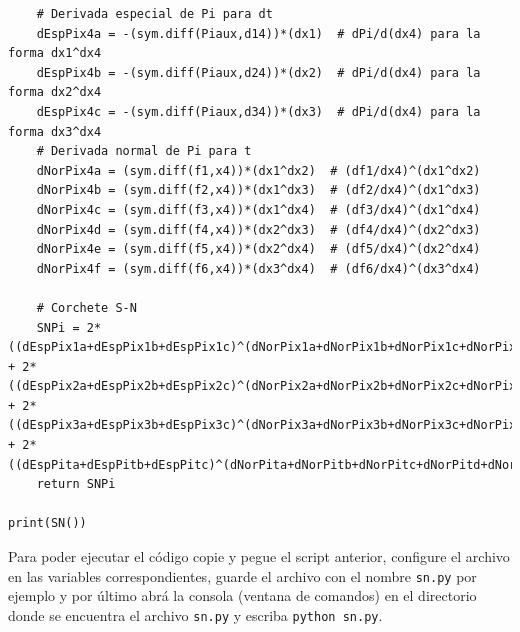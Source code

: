 \documentclass[a4paper,10pt]{book}
\begin{document}
\begin{lstlisting}
    # Derivada especial de Pi para dt 
    dEspPix4a = -(sym.diff(Piaux,d14))*(dx1)  # dPi/d(dx4) para la forma dx1^dx4
    dEspPix4b = -(sym.diff(Piaux,d24))*(dx2)  # dPi/d(dx4) para la forma dx2^dx4
    dEspPix4c = -(sym.diff(Piaux,d34))*(dx3)  # dPi/d(dx4) para la forma dx3^dx4
    # Derivada normal de Pi para t 
    dNorPix4a = (sym.diff(f1,x4))*(dx1^dx2)  # (df1/dx4)^(dx1^dx2)
    dNorPix4b = (sym.diff(f2,x4))*(dx1^dx3)  # (df2/dx4)^(dx1^dx3)
    dNorPix4c = (sym.diff(f3,x4))*(dx1^dx4)  # (df3/dx4)^(dx1^dx4)
    dNorPix4d = (sym.diff(f4,x4))*(dx2^dx3)  # (df4/dx4)^(dx2^dx3)
    dNorPix4e = (sym.diff(f5,x4))*(dx2^dx4)  # (df5/dx4)^(dx2^dx4)
    dNorPix4f = (sym.diff(f6,x4))*(dx3^dx4)  # (df6/dx4)^(dx3^dx4)
    
    # Corchete S-N 
    SNPi = 2*((dEspPix1a+dEspPix1b+dEspPix1c)^(dNorPix1a+dNorPix1b+dNorPix1c+dNorPix1d+dNorPix1e+dNorPix1f)) + 2*((dEspPix2a+dEspPix2b+dEspPix2c)^(dNorPix2a+dNorPix2b+dNorPix2c+dNorPix2d+dNorPix2e+dNorPix2f)) + 2*((dEspPix3a+dEspPix3b+dEspPix3c)^(dNorPix3a+dNorPix3b+dNorPix3c+dNorPix3d+dNorPix3e+dNorPix3f)) + 2*((dEspPita+dEspPitb+dEspPitc)^(dNorPita+dNorPitb+dNorPitc+dNorPitd+dNorPite+dNorPitf))
    return SNPi

print(SN())
\end{lstlisting}

Para poder ejecutar el c\'odigo copie y pegue el script anterior, configure el archivo en las variables correspondientes, guarde el archivo con el nombre \texttt{sn.py} por ejemplo y por \'ultimo abr\'a la consola (ventana de comandos) en el directorio donde se encuentra el archivo \texttt{sn.py} y escriba \texttt{python sn.py}.  


\end{document}
